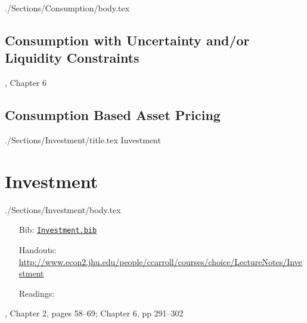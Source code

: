 \documentclass{econtex}
\begin{document}
\begin{verbatimwrite}{./Sections/Consumption/body.tex}
\subsection{Consumption with Uncertainty and/or Liquidity Constraints}

\bi
\reqd \dt, Chapter 6
\recm \cite{zeldes_jpe89}
\recm \cite{caballero:jme}
\recm \cite{deatonLiqConstr}
\recm \cite{toche:urisk}
\reqd \cite{carroll:atheorynberwp}
\reqd \cite{CarrollKimballPSPW}
\reqd \cite{carroll&summers:cparallelsy}
\recm \cite{BufferStockTheory}
\recm \cite{carroll:death}
\ei

\subsection{Consumption Based Asset Pricing}

\bi
\reqd \cite{lucas:assetpricing}
\reqd \cite{mehra&prescott:puzzle}
\recm \cite{blanchard:burstingbubbles}
\recm \cite{carrollIrrational}
\ei
\end{verbatimwrite}



\ifPost
{} 
\fi


\begin{verbatimwrite}{./Sections/Investment/title.tex}
Investment
\end{verbatimwrite}

\section{Investment}\label{sec:Investment}
\begin{verbatimwrite}{./Sections/Investment/body.tex}
\begin{itemize}
\item[Bib:] \texttt{\href{http://www.econ2.jhu.edu/people/ccarroll/courses/Choice/Syllabus/Investment.bib}{Investment.bib}}
\item[Handouts:]  \url{http://www.econ2.jhu.edu/people/ccarroll/courses/choice/LectureNotes/Investment}
\item[Readings:]
\end{itemize}

\providecommand{\blf}{\cite{blanchard&fischer:text}}
\providecommand{\ro}{\cite{romer:text}}

\bi
\reqd \blf, Chapter 2, pages 58--69; Chapter 6, pp 291--302
\recm \cite{hall&jorgenson:i}
\reqd \cite{hayashi:q}
\reqd \cite{abel&eberly:unified}
\reqd \cite{chh:reconsider}
\ei

\end{verbatimwrite}
\end{document}
